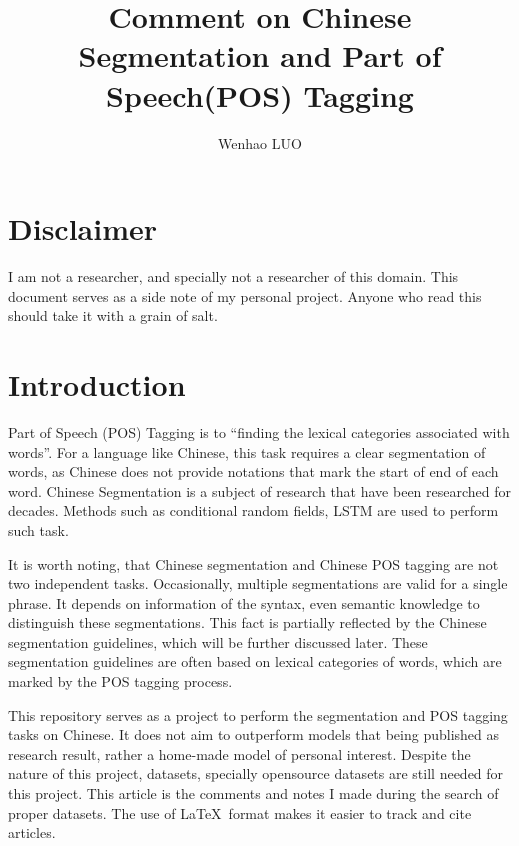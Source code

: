 \documentclass[11pt]{article}
\title{Comment on Chinese Segmentation and Part of Speech(POS) Tagging}
\author{Wenhao LUO}
\begin{document}
\maketitle

\section*{Disclaimer}

\par I am not a researcher, and specially not a researcher of this domain. This document serves as a side note of my personal project. Anyone who read this should take it with a grain of salt.

\section{Introduction}

\par Part of Speech (POS) Tagging is to ``finding the lexical categories associated with words''\cite{kornai2019semantics}. For a language like Chinese, this task requires a clear segmentation of words, as Chinese does not provide notations that mark the start of end of each word. Chinese Segmentation is a subject of research that have been researched for decades. Methods such as conditional random fields\cite{peng2004chinese}, LSTM\cite{ma2018state} are used to perform such task.

\par It is worth noting, that Chinese segmentation and Chinese POS tagging are not two independent tasks. Occasionally, multiple segmentations are valid for a single phrase. It depends on information of the syntax, even semantic knowledge to distinguish these segmentations. This fact is partially reflected by the Chinese segmentation guidelines, which will be further discussed later. These segmentation guidelines are often based on lexical categories of words, which are marked by the POS tagging process.

\par This repository serves as a project to perform the segmentation and POS tagging tasks on Chinese. It does not aim to outperform models that being published as research result, rather a home-made model of personal interest. Despite the nature of this project, datasets, specially opensource datasets are still needed for this project. This article is the comments and notes I made during the search of proper datasets. The use of \LaTeX \ format makes it easier to track and cite articles.
\end{document}
